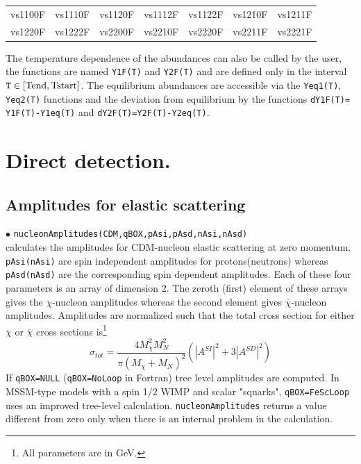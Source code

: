 \documentclass[12pt,a4paper]{article}
\begin{document}
\begin{center}
\begin{tabular}{ l l l l l l l }
vs1100F & vs1110F & vs1120F&vs1112F&vs1122F&vs1210F&vs1211F\\
vs1220F&vs1222F&vs2200F&vs2210F&vs2220F&vs2211F& vs2221F
\end{tabular}
\end{center} 

The  temperature dependence  of the abundances can also be called by the user, the functions are named {\tt Y1F(T)} and {\tt Y2F(T)} and are defined only in the  interval ${\tt T}\in
[\rm{Tend},\rm{Tstart}]$. The equilibrium abundances are accessible via  the  { \tt Yeq1(T)}, { \tt Yeq2(T)} functions and the deviation from equilibrium  
by the functions
 {\tt dY1F(T)= Y1F(T)-Y1eq(T)}  and   { \tt dY2F(T)=Y2F(T)-Y2eq(T)}.
 
 

\section{Direct detection.}
\subsection{Amplitudes for elastic scattering}
\noindent
 $\bullet$ \verb|nucleonAmplitudes(CDM,qBOX,pAsi,pAsd,nAsi,nAsd)|\\
calculates the amplitudes for CDM-nucleon elastic
scattering at zero momentum. \verb|pAsi(nAsi)| are spin
independent amplitudes for protons(neutrons) whereas
\verb|pAsd(nAsd)| are the corresponding spin dependent amplitudes.
Each of these four parameters is an array of 
dimension 2. The zeroth (first) element of these arrays gives the
$\chi$-nucleon amplitudes whereas the second element gives
$\overline{\chi}$-nucleon amplitudes. Amplitudes are normalized
such that the total cross section for either $\chi$ or $\overline
\chi$ cross sections is\footnote{All parameters are in GeV.}
\begin{equation}
\sigma_{tot}=\frac{4M_{\chi}^2 M_N^2}{\pi(M_{\chi}+M_N)^2}(|A^{SI}|^2+3|A^{SD}|^2)
\label{eq:norm}
\end{equation}
If \verb|qBOX=NULL| (\verb|qBOX=NoLoop| in Fortran) tree level amplitudes are computed. 
In MSSM-type models with a spin 1/2 WIMP and scalar "squarks",   
\verb|qBOX=FeScLoop| uses  an improved tree-level calculation.  
\verb|nucleonAmplitudes| returns a value different from zero only
when there is an internal problem in the calculation.
\end{document}
